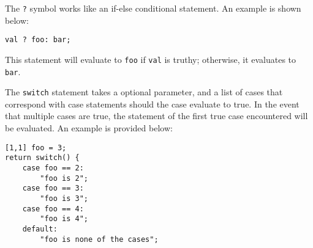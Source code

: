 			The \texttt{?} symbol works like an if-else conditional statement. An example is shown below:
			\begin{lstlisting}
val ? foo: bar;
			\end{lstlisting}
			This statement will evaluate to \texttt{foo} if \texttt{val} is truthy; otherwise, it evaluates to \texttt{bar}.
			
			The \texttt{switch} statement takes a optional parameter, and a list of cases that correspond with case statements should the case evaluate to true. In the event that multiple cases are true, the statement of the first true case encountered will be evaluated. An example is provided below:
			\begin{lstlisting}
[1,1] foo = 3;
return switch() {
	case foo == 2:
		"foo is 2";
	case foo == 3:
		"foo is 3";
	case foo == 4:
		"foo is 4";
	default:
		"foo is none of the cases";
			\end{lstlisting}
